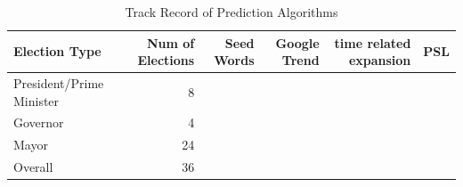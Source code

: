 \begin{table}[h]
	\centering
	\begin{tabular}{| l | r | r | r |r|r|}
		\hline
		Election Type & Num of Elections & Seed Words & Google Trend & time related expansion & PSL\\
		\hline
		President/Prime Minister & 8 &  & & &\\
		Governor & 4 &  & & & \\
		Mayor & 24 &  & & &\\
		Overall & 36 &  & & &\\
		\hline
	\end{tabular}
	\caption{Track Record of Prediction Algorithms}
	\label{table:trackRecord}
\end{table}
